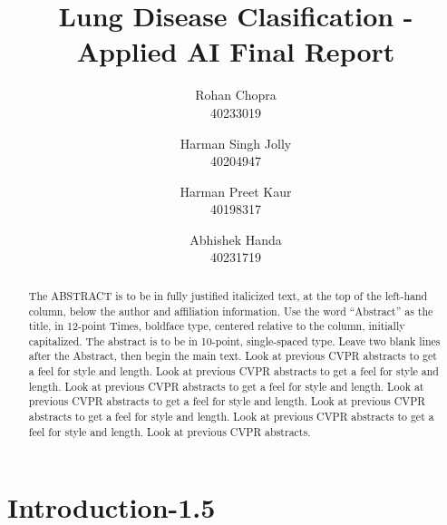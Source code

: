 \documentclass[10pt,twocolumn,letterpaper]{article}
\def\subName{Applied AI }
\begin{document}
\def\cvprPaperID{Group-Q} %
\def\confName{COMP6721}
\def\confYear{2022}

\title{Lung Disease Clasification - \subName Final Report}
\author{Rohan Chopra\\
\small 40233019\\
\and
Harman Singh Jolly\\
\small 40204947\\
\and
Harman Preet Kaur\\
\small 40198317\\
\and
Abhishek Handa\\
\small 40231719\\
}
\maketitle

\begin{abstract}
  The ABSTRACT is to be in fully justified italicized text, at the top of the left-hand column, 
  below the author and affiliation information.
  Use the word ``Abstract'' as the title, in 12-point Times, boldface type, centered relative 
  to the column, initially capitalized.
  The abstract is to be in 10-point, single-spaced type.
  Leave two blank lines after the Abstract, then begin the main text.
  Look at previous CVPR abstracts to get a feel for style and length.
  Look at previous CVPR abstracts to get a feel for style and length.
  Look at previous CVPR abstracts to get a feel for style and length.
  Look at previous CVPR abstracts to get a feel for style and length.
  Look at previous CVPR abstracts to get a feel for style and length.
  Look at previous CVPR abstracts to get a feel for style and length.
  Look at previous CVPR abstracts.
\end{abstract}

\section{Introduction-1.5}
\label{sec:intro}
\end{document}
